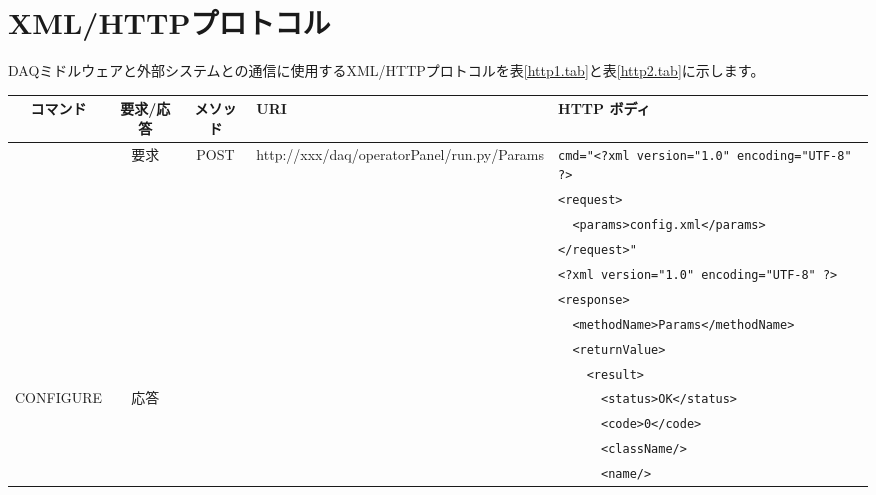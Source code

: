 \documentclass[a4j,10pt,dvips,onecolumn,oneside,final]{jarticle}%
\begin{document}
\section{XML/HTTPプロトコル}\label{xmlhttp}
DAQミドルウェアと外部システムとの通信に使用するXML/HTTPプロトコルを表\ref{http1.tab}と表\ref{http2.tab}に示します。
\begin{table}[htbp]
\begin{center}
{\scriptsize
    \begin{tabular}{|c|c|c|l|l|}\hline
      コマンド    & 要求/応答 & メソッド & URI                      & HTTP ボディ\\ \hline
                  & 要求      & POST & http://xxx/daq/operatorPanel/run.py/Params & \verb|cmd="<?xml version="1.0" encoding="UTF-8" ?>|\\
                  &           &      &                                            & \verb|<request>|\\ 
                  &           &      &                                            & \verb|  <params>config.xml</params>|\\
                  &           &      &                                            & \verb|</request>"|\\ \cline{2-5}
                  &           &      &                                            & \verb|<?xml version="1.0" encoding="UTF-8" ?>|\\ 
                  &           &      &                                            & \verb|<response>|\\ 
                  &           &      &                                            & \verb|  <methodName>Params</methodName>|\\ 
                  &           &      &                                            & \verb|  <returnValue>|\\ 
                  &           &      &                                            & \verb|    <result>|\\ 
      CONFIGURE   & 応答      &      &                                            & \verb|      <status>OK</status>|\\ 
                  &           &      &                                            & \verb|      <code>0</code>|\\ 
                  &           &      &                                            & \verb|      <className/>|\\ 
                  &           &      &                                            & \verb|      <name/>|\\ 

\end{tabular}}
\end{center}
\end{table}
\end{document}
